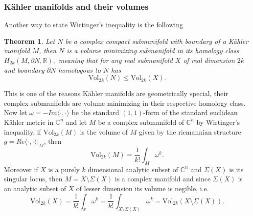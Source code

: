 \documentclass[12pt,twoside,a4paper]{report}
\newtheorem{theorem}{Theorem}[section]
\newcommand{\re}{\ensuremath{\mathbb R }}
\newcommand{\con}{\ensuremath{\mathbb{C}^n}}
\begin{document}
\subsubsection{Kähler manifolds and their volumes}
\noindent Another way to state Wirtinger's inequality is the following
\begin{theorem}\label{wirtinger}
        Let $N$ be a complex compact submanifold with boundary of a Kähler manifold $M$, then $N$ is a volume minimizing
        submanifold in its homology class $H_{2k}(M,\partial N,\re),$ meaning that for any real submanifold $X$ of
        real dimension $2k$ and boundary $\partial N$ homologous to $N$ has
        \[
          \textrm{Vol}_{2k}(N)\leq \textrm{Vol}_{2k}(X).
        \]
\end{theorem}
\noindent This is one of the reasons Kähler manifolds are geometrically special, their complex submanifolds are volume minimizing in their respective homology class. Now let $\omega=-Im\langle\cdot,\cdot\rangle$ be the standard $(1,1)$-form of the standard euclidean Kähler metric in $\con$ and let $M$ be a complex submanifold of $\con$ by Wirtinger's inequality, if $\textrm{Vol}_{2k}(M)$ is the volume of $M$ given by the riemannian structure $g=Re\langle\cdot,\cdot\rangle\vert_{M}$, then
\begin{equation}
        \textrm{Vol}_{2k}(M)= \frac{1}{k!}\int_M \omega^k.
\end{equation}
\noindent Moreover if $X$ is a purely $k$ dimensional analytic subset of $\con$ and $\Sigma(X)$ is its singular locus, then $M=X\setminus\Sigma(X)$ is a complex manifold and since $\Sigma(X)$ is an analytic subset of $X$ of lesser dimension its volume is negible, i.e.
\[
    \textrm{Vol}_{2k}(X)= \frac{1}{k!}\int_{x} \omega^k=
                              \frac{1}{k!}\int_{X\setminus\Sigma(X)} \omega^k=
                                                            \textrm{Vol}_{2k}(X\setminus\Sigma(X)).
\]
\end{document}
